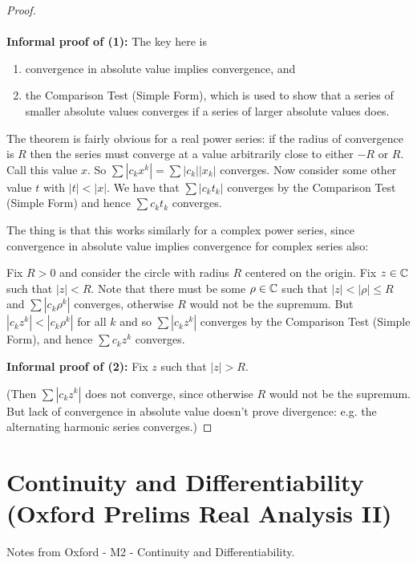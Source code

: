 \begin{proof}~\\~\\
  {\bf Informal proof of (1):} The key here is
  \begin{enumerate}
  \item convergence in absolute value implies convergence, and
  \item the Comparison Test (Simple Form), which is used to show that a series of smaller absolute
    values converges if a series of larger absolute values does.
  \end{enumerate}
  The theorem is fairly obvious for a real power series: if the radius of convergence is $R$ then
  the series must converge at a value arbitrarily close to either $-R$ or $R$. Call this value
  $x$. So $\sum |c_kx^k| = \sum |c_k||x_k|$ converges. Now consider some other value $t$ with
  $|t| < |x|$. We have that $\sum |c_kt_k|$ converges by the Comparison Test (Simple Form) and
  hence $\sum c_kt_k$ converges.

  The thing is that this works similarly for a complex power series, since convergence in absolute
  value implies convergence for complex series also:

  Fix $R > 0$ and consider the circle with radius $R$ centered on the origin. Fix $z \in \mathbb{C}$ such
  that $|z| < R$. Note that there must be some $\rho \in \mathbb{C}$ such that $|z| < |\rho| \leq R$ and
  $\sum |c_k\rho^k|$ converges, otherwise $R$ would not be the supremum. But
  $|c_kz^k| < |c_k\rho^k|$ for all $k$ and so $\sum |c_kz^k|$ converges by the Comparison Test
  (Simple Form), and hence $\sum c_kz^k$ converges.

  {\bf Informal proof of (2):} Fix $z$ such that $|z| > R$.

  (Then $\sum |c_kz^k|$ does not converge, since otherwise $R$ would not be the supremum. But lack
  of convergence in absolute value doesn't prove divergence: e.g. the alternating harmonic series
  converges.)


\end{proof}


\section{Continuity and Differentiability\\(Oxford Prelims Real Analysis II)}
Notes from Oxford - M2 - Continuity and Differentiability.

